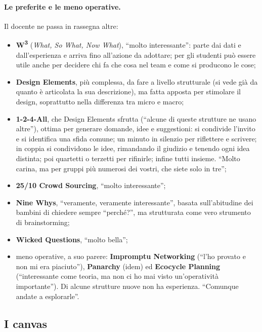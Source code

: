 \paragraph{Le preferite e le meno operative.} Il docente ne passa in rassegna altre:
\begin{itemize}
  \item \textbf{W\textsuperscript{3}} (\emph{What, So What, Now What}), ``molto
        interessante'': parte dai dati e dall'esperienza e arriva fino all'azione da
        adottare; per gli studenti può essere utile anche per decidere chi fa che cosa nel
        team e come si producono le cose;
  \item \textbf{Design Elements}, più complessa, da fare a livello strutturale (si vede
        già da quanto è articolata la sua descrizione), ma fatta apposta per stimolare il
        design, soprattutto nella differenza tra micro e macro;
  \item \textbf{1-2-4-All}, che Design Elements sfrutta (``alcune di queste strutture ne
        usano altre''), ottima per generare domande, idee e suggestioni: si condivide
        l'invito e si identifica una sfida comune; un minuto in silenzio per riflettere e
        scrivere; in coppia si condividono le idee, rimandando il giudizio e tenendo ogni
        idea distinta; poi quartetti o terzetti per rifinirle; infine tutti insieme.
        ``Molto carina, ma per gruppi più numerosi dei vostri, che siete solo in tre'';
  \item \textbf{25/10 Crowd Sourcing}, ``molto interessante'';
  \item \textbf{Nine Whys}, ``veramente, veramente interessante'', basata sull'abitudine
        dei bambini di chiedere sempre ``perché?'', ma strutturata come vero strumento di
        brainstorming;
  \item \textbf{Wicked Questions}, ``molto bella'';
  \item meno operative, a suo parere: \textbf{Impromptu Networking} (``l'ho provato e non
        mi era piaciuto''), \textbf{Panarchy} (idem) ed \textbf{Ecocycle Planning}
        (``interessante come teoria, ma non ci ho mai visto un'operatività importante'').
        Di alcune strutture nuove non ha esperienza. ``Comunque andate a esplorarle''.
\end{itemize}

\subsection{I canvas}

